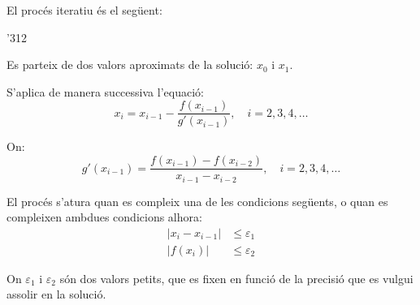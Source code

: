 El proc\'{e}s iteratiu \'{e}s el seg\"{u}ent:

\begin{dingautolist}{'312}
    \item Es parteix de dos valors aproximats de la soluci\'{o}: $x_0$ i $x_1$.

    \item   S'aplica de manera successiva l'equaci\'{o}:
            \begin{equation}\label{eq:secant-1}
              x_i = x_{i-1} - \frac{f(x_{i-1})}{g'(x_{i-1})}, \quad i=2,3,4,\dots
            \end{equation}

            On:
            \begin{equation}\label{eq:secant-2}
              g'(x_{i-1}) = \frac{f(x_{i-1}) - f(x_{i-2}) } {x_{i-1} - x_{i-2}}, \quad i=2,3,4,\dots
            \end{equation}

    \item   El proc\'{e}s s'atura quan es compleix una de les condicions seg\"{u}ents, o quan es compleixen ambdues condicions alhora:
            \begin{subequations}\begin{align}
              |x_i - x_{i-1}| &\leq \varepsilon_1 \\
              |f(x_i)| &\leq \varepsilon_2
            \end{align}\end{subequations}

            On $\varepsilon_1$ i $\varepsilon_2$ s\'{o}n dos valors petits, que es fixen en funci\'{o} de la precisi\'{o} que es vulgui assolir en la soluci\'{o}.
\end{dingautolist}

